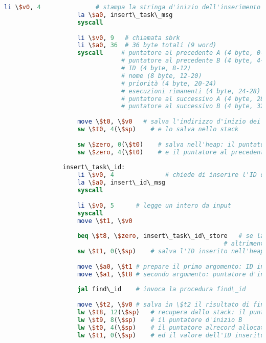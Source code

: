 \begin{center}
\begin{lstlisting}[language=mips, gobble=14, stepnumber=1]
                    li \$v0, 4               # stampa la stringa d'inizio dell'inserimento di un task
                    la \$a0, insert\_task\_msg
                    syscall
                    
                    li \$v0, 9   # chiamata sbrk
                    li \$a0, 36  # 36 byte totali (9 word)
                    syscall     # puntatore al precedente A (4 byte, 0-4)
                                # puntatore al precedente B (4 byte, 4-8)
                                # ID (4 byte, 8-12)
                                # nome (8 byte, 12-20)
                                # priorità (4 byte, 20-24)
                                # esecuzioni rimanenti (4 byte, 24-28)
                                # puntatore al successivo A (4 byte, 28-32)
                                # puntatore al successivo B (4 byte, 32-36)
                                
                    move \$t0, \$v0   # salva l'indirizzo d'inizio dei 36 byte allocati n \$t0
                    sw \$t0, 4(\$sp)	# e lo salva nello stack
                    
                    sw \$zero, 0(\$t0)    # salva nell'heap: il puntatore al precedente A
                    sw \$zero, 4(\$t0)    # e il puntatore al precedente B
                    
                insert\_task\_id:
                    li \$v0, 4				# chiede di inserire l'ID del task
                    la \$a0, insert\_id\_msg
                    syscall
                    
                    li \$v0, 5		# legge un intero da input
                    syscall
                    move \$t1, \$v0
                    
                    beq \$t8, \$zero, insert\_task\_id\_store	# se la coda è vuota, salva l'ID inserito
                											# altrimenti
                    sw \$t1, 0(\$sp)	# salva l'ID inserito nell'heap
                    
                    move \$a0, \$t1	# prepare il primo argomento: ID inserito
                    move \$a1, \$t8	# secondo argomento: puntatore d'inizio A
                    
                    jal find\_id	# invoca la procedura find\_id
                    
                    move \$t2, \$v0	# salva in \$t2 il risultato di find\_id
                    lw \$t8, 12(\$sp)	# recupera dallo stack: il puntatore d'inizio A
                    lw \$t9, 8(\$sp)	# il puntatore d'inizio B
                    lw \$t0, 4(\$sp)	# il puntatore alrecord allocato nell'heap
                    lw \$t1, 0(\$sp)	# ed il valore dell'ID inserito
                    

\end{lstlisting}
\end{center}

